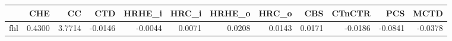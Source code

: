\begin{tabular}{lrrrrrrrrrrr}
\toprule
 & CHE & CC & CTD & HRHE_i & HRC_i & HRHE_o & HRC_o & CBS & CTnCTR & PCS & MCTD \\
\midrule
fhl & 0.4300 & 3.7714 & -0.0146 & -0.0044 & 0.0071 & 0.0208 & 0.0143 & 0.0171 & -0.0186 & -0.0841 & -0.0378 \\
\bottomrule
\end{tabular}
